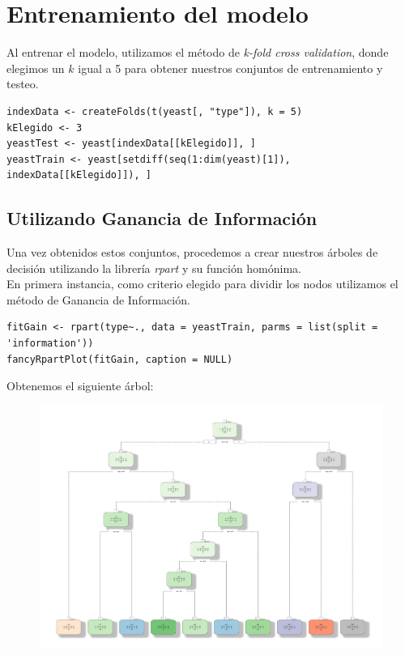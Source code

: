 \documentclass[11pt]{article}
\begin{document}
\section*{Entrenamiento del modelo}

Al entrenar el modelo, utilizamos el método de \emph{k-fold cross validation},
donde elegimos un $k$ igual a 5 para obtener nuestros conjuntos de entrenamiento
y testeo. \\

\begin{verbatim}
indexData <- createFolds(t(yeast[, "type"]), k = 5)
kElegido <- 3
yeastTest <- yeast[indexData[[kElegido]], ]
yeastTrain <- yeast[setdiff(seq(1:dim(yeast)[1]), indexData[[kElegido]]), ]
\end{verbatim}

\subsection*{Utilizando Ganancia de Información}

Una vez obtenidos estos conjuntos, procedemos a crear nuestros árboles de 
decisión utilizando la librería \emph{rpart} y su función homónima. \\

En primera instancia, como criterio elegido para dividir los nodos utilizamos el 
método de Ganancia de Información.

\begin{verbatim}
fitGain <- rpart(type~., data = yeastTrain, parms = list(split = 'information'))
fancyRpartPlot(fitGain, caption = NULL)
\end{verbatim}

Obtenemos el siguiente árbol:

\begin{figure}[h!]
  \begin{center}
    \includegraphics[width=1\linewidth]{treeGain.pdf}
  \end{center}
\end{figure}
\end{document}
